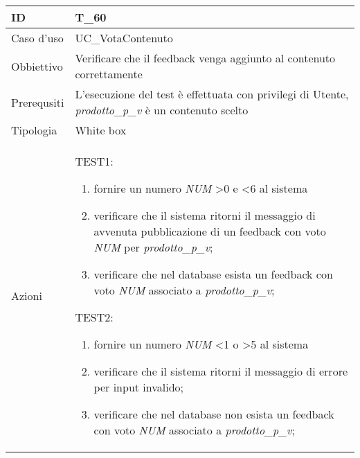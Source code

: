 \begin{table}[hb]
    \centering
    \begin{tabular}{ |p{2cm}|p{10cm}|  }
        \hline
        ID          & T\_60                                                                              \\\hline
        Caso d'uso  & UC\_VotaContenuto                                                                  \\\hline
        Obbiettivo  & Verificare che il feedback venga aggiunto al contenuto correttamente               \\\hline
        Prerequsiti & L'esecuzione del test è effettuata con privilegi di Utente, \emph{prodotto\_p\_v}
        è un contenuto scelto                                                                            \\\hline
        Tipologia   & White box                                                                          \\\hline
        Azioni      &
        TEST1:
        \begin{enumerate}[nosep, topsep=0pt]
            \item fornire un numero \emph{NUM} \textgreater 0 e \textless 6 al sistema
            \item verificare che il sistema ritorni il messaggio di avvenuta pubblicazione
                  di un feedback con voto \emph{NUM} per \emph{prodotto\_p\_v};
            \item verificare che nel database esista un feedback con voto \emph{NUM} associato a
                  \emph{prodotto\_p\_v};
        \end{enumerate}
        \vspace{0.5cm} TEST2:
        \begin{enumerate}[nosep, topsep=0pt]
            \item fornire un numero \emph{NUM} \textless 1 o \textgreater 5 al sistema
            \item verificare che il sistema ritorni il messaggio di errore per input invalido;
            \item verificare che nel database non esista un feedback con voto \emph{NUM} associato a
                  \emph{prodotto\_p\_v};
        \end{enumerate}
        \\\hline
    \end{tabular}
\end{table}

